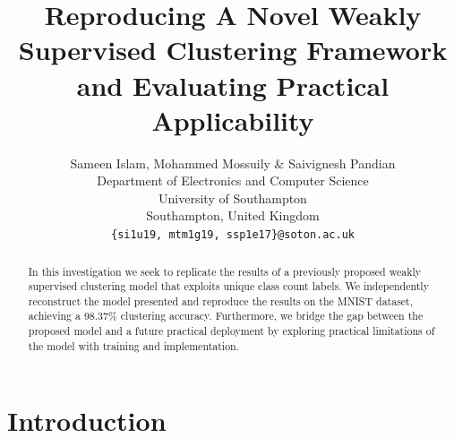 \documentclass{article} %
\title{Reproducing A Novel Weakly Supervised Clustering Framework and Evaluating Practical Applicability}
\author{Sameen Islam, Mohammed Mossuily \& Saivignesh Pandian \\
Department of Electronics and Computer Science\\
University of Southampton \\
Southampton, United Kingdom\\
\texttt{\{si1u19, mtm1g19, ssp1e17\}@soton.ac.uk} }
\begin{document}
\maketitle

\begin{abstract}
In this investigation we seek to replicate the results of a previously proposed weakly supervised clustering model that exploits unique class count labels. We independently reconstruct the model presented and reproduce the results on the MNIST dataset, achieving a 98.37\% clustering accuracy. Furthermore, we bridge the gap between the proposed model and a future practical deployment by exploring practical limitations of the model with training and implementation.
\end{abstract}


\section{Introduction} %
\end{document}
